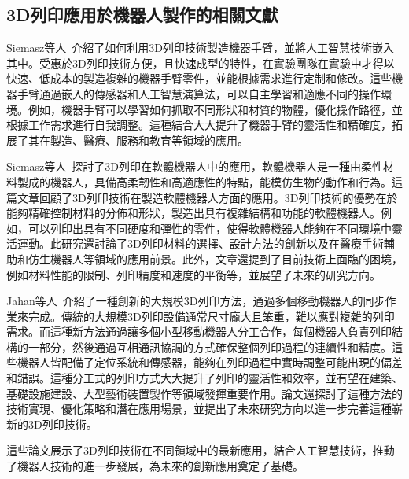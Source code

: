 \documentclass[class=NCU_thesis, crop=false]{standalone}
\begin{document}


\subsection{3D列印應用於機器人製作的相關文獻}
Siemasz等人~\cite{SIEMASZ20203741}介紹了如何利用3D列印技術製造機器手臂，並將人工智慧技術嵌入其中。受惠於3D列印技術方便，且快速成型的特性，在實驗團隊在實驗中才得以快速、低成本的製造複雜的機器手臂零件，並能根據需求進行定制和修改。這些機器手臂通過嵌入的傳感器和人工智慧演算法，可以自主學習和適應不同的操作環境。例如，機器手臂可以學習如何抓取不同形狀和材質的物體，優化操作路徑，並根據工作需求進行自我調整。這種結合大大提升了機器手臂的靈活性和精確度，拓展了其在製造、醫療、服務和教育等領域的應用。

Siemasz等人~\cite{SIEMASZ20203741}探討了3D列印在軟體機器人中的應用，軟體機器人是一種由柔性材料製成的機器人，具備高柔韌性和高適應性的特點，能模仿生物的動作和行為。這篇文章回顧了3D列印技術在製造軟體機器人方面的應用。3D列印技術的優勢在於能夠精確控制材料的分佈和形狀，製造出具有複雜結構和功能的軟體機器人。例如，可以列印出具有不同硬度和彈性的零件，使得軟體機器人能夠在不同環境中靈活運動。此研究還討論了3D列印材料的選擇、設計方法的創新以及在醫療手術輔助和仿生機器人等領域的應用前景。此外，文章還提到了目前技術上面臨的困境，例如材料性能的限制、列印精度和速度的平衡等，並展望了未來的研究方向。

Jahan等人~\cite{gul20183d}介紹了一種創新的大規模3D列印方法，通過多個移動機器人的同步作業來完成。傳統的大規模3D列印設備通常尺寸龐大且笨重，難以應對複雜的列印需求。而這種新方法通過讓多個小型移動機器人分工合作，每個機器人負責列印結構的一部分，然後通過互相通訊協調的方式確保整個列印過程的連續性和精度。這些機器人皆配備了定位系統和傳感器，能夠在列印過程中實時調整可能出現的偏差和錯誤。這種分工式的列印方式大大提升了列印的靈活性和效率，並有望在建築、基礎設施建設、大型藝術裝置製作等領域發揮重要作用。論文還探討了這種方法的技術實現、優化策略和潛在應用場景，並提出了未來研究方向以進一步完善這種嶄新的3D列印技術。

這些論文展示了3D列印技術在不同領域中的最新應用，結合人工智慧技術，推動了機器人技術的進一步發展，為未來的創新應用奠定了基礎。
\end{document}
